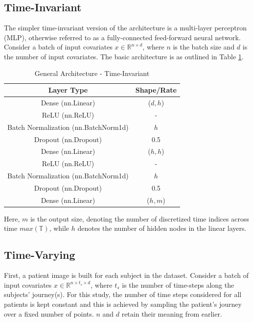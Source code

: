 \documentclass[%
 twocolumn,
 reprint,
 amsmath,amssymb,
 aps,nofootinbib
]{revtex4-2}
\begin{document}
\subsection{\label{time_invar_arch}Time-Invariant}
The simpler time-invariant version of the architecture is a multi-layer perceptron (MLP), otherwise referred to as a fully-connected feed-forward neural network. Consider a batch of input covariates $x \in \mathbb{R}^{n\times d}$, where $n$ is the batch size and $d$ is the number of input covariates. The basic architecture is as outlined in Table \ref{tab:arch1}.\\

\begin{table}[H]
  \centering
  \begin{tabular}{|c|c|}
    \hline
    \textbf{Layer Type} & \textbf{Shape/Rate} \\
    \hline
    Dense (nn.Linear) & ($d, h$) \\
    ReLU (nn.ReLU) & - \\
    Batch Normalization (nn.BatchNorm1d) & $h$ \\
    Dropout (nn.Dropout) & 0.5 \\ 
    Dense (nn.Linear) & ($h, h$) \\
    ReLU (nn.ReLU) & - \\
    Batch Normalization (nn.BatchNorm1d) & $h$ \\
    Dropout (nn.Dropout) & 0.5 \\
    Dense (nn.Linear) & ($h, m$) \\
    \hline
  \end{tabular}
  \caption[General Architecture Time-Invariant]{General Architecture - Time-Invariant}
  \label{tab:arch1}
\end{table}

Here, $m$ is the output size, denoting the number of discretized time indices across time $max(\mathbb{T})$, while $h$ denotes the number of hidden nodes in the linear layers.\\


\subsection{\label{time_var_arch}Time-Varying}
First, a patient image is built for each subject in the dataset. Consider a batch of input covariates $x \in \mathbb{R}^{n\times t_s \times d}$, where $t_s$ is the number of time-steps along the subjects' journey(s). For this study, the number of time steps considered for all patients is kept constant and this is achieved by sampling the patient's journey over a fixed number of points. $n$ and $d$ retain their meaning from earlier. \\
\end{document}
